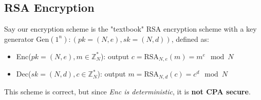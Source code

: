 \subsection{RSA Encryption}
Say our encryption scheme is the "textbook" RSA encryption scheme with a key generator \(\text{Gen} (1^n): (pk = (N, e), sk = (N, d))\), defined as: 
\begin{itemize}
    \item Enc(\(pk = (N,e), m \in \mathbb{Z} _N^*\)): output \(c = \text{RSA}_{N, e} (m) = m^e \mod N\)
    \item Dec(\(sk = (N, d), c \in \mathbb{Z} _N^*\)): output \(m = \text{RSA} _{N,d} (c) = c^d \mod N\)
\end{itemize}
This scheme is correct, but since \emph{Enc is deterministic}, it is \textbf{not CPA secure}. 